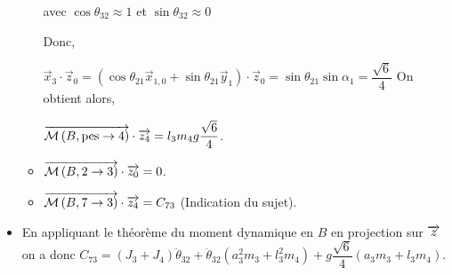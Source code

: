 \documentclass[10pt,fleqn]{article} %
\begin{document}
\begin{itemize}
\begin{itemize}
avec $\cos\theta_{32}\approx 1$ et $\sin\theta_{32}\approx 0$

 Donc, 
 
 $\overrightarrow{x}_3\cdot \overrightarrow{z}_0=\left(\cos\theta_{21}\overrightarrow{x}_{1,0}+\sin\theta_{21}\overrightarrow{y}_1\right)\cdot \overrightarrow{z}_0=\sin\theta_{21}\sin\alpha_1=\dfrac{\sqrt{6}}{4}$
 On obtient alors,
 
 $\overrightarrow{\mathcal{M}\left( {B}, {\text{pes}} \rightarrow {4}\right)}\cdot \overrightarrow{z_4} = l_3 m_4g  \dfrac{\sqrt{6}}{4}$.







\item $\overrightarrow{\mathcal{M}\left( {B}, {2} \rightarrow {3}\right)}\cdot \overrightarrow{z_0}=0$.
\item $\overrightarrow{\mathcal{M}\left( {B}, {7} \rightarrow {3}\right)}\cdot \overrightarrow{z_4}=C_{73}$ (Indication du sujet).
\end{itemize}
\item En appliquant le théorème du moment dynamique en $B$ en projection sur $\overrightarrow{z}$ on a donc 
$ C_{73} =  \left(J_3+J_4\right) \ddot{\theta}_{32}+\ddot{\theta}_{32}\left( a_3^2 m_3  +l_3^2 m_4  \right) + g  \dfrac{\sqrt{6}}{4} \left( a_3 m_3 + l_3 m_4\right) $.
\end{itemize}
\end{document}
